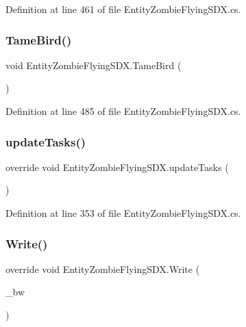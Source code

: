 Definition at line 461 of file Entity\+Zombie\+Flying\+S\+D\+X.\+cs.

\mbox{\label{class_entity_zombie_flying_s_d_x_ab5f6cc5c4f27c468096e5f2ac082f606}} 
\subsubsection{\texorpdfstring{TameBird()}{TameBird()}}
{\footnotesize\ttfamily void Entity\+Zombie\+Flying\+S\+D\+X.\+Tame\+Bird (\begin{DoxyParamCaption}{ }\end{DoxyParamCaption})}



Definition at line 485 of file Entity\+Zombie\+Flying\+S\+D\+X.\+cs.

\mbox{\label{class_entity_zombie_flying_s_d_x_a835c38b9472784c6867b99482a76342b}} 
\subsubsection{\texorpdfstring{updateTasks()}{updateTasks()}}
{\footnotesize\ttfamily override void Entity\+Zombie\+Flying\+S\+D\+X.\+update\+Tasks (\begin{DoxyParamCaption}{ }\end{DoxyParamCaption})\hspace{0.3cm}{\ttfamily [protected]}}



Definition at line 353 of file Entity\+Zombie\+Flying\+S\+D\+X.\+cs.

\mbox{\label{class_entity_zombie_flying_s_d_x_a7b74c55dec307fe3acb6ca0643cd70fe}} 
\subsubsection{\texorpdfstring{Write()}{Write()}}
{\footnotesize\ttfamily override void Entity\+Zombie\+Flying\+S\+D\+X.\+Write (\begin{DoxyParamCaption}\item[{Binary\+Writer}]{\+\_\+bw }\end{DoxyParamCaption})}



